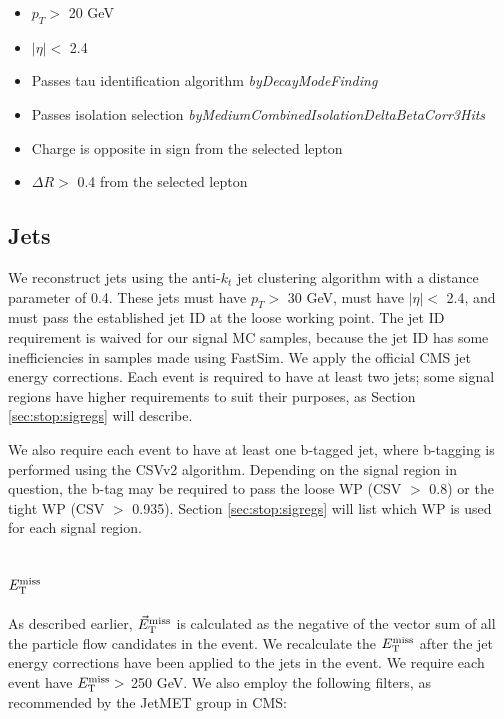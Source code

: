 \begin{itemize}
\item $p_T >$ 20 GeV
\item $|\eta| <$ 2.4
\item Passes tau identification algorithm \emph{byDecayModeFinding}
\item Passes isolation selection
  \emph{byMediumCombinedIsolationDeltaBetaCorr3Hits}
\item Charge is opposite in sign from the selected lepton
\item $\Delta R >$ 0.4 from the selected lepton
\end{itemize}

\subsection{Jets}
\label{ssec:stop:jets}

We reconstruct jets using the anti-$k_t$ jet clustering algorithm
\cite{antikt} with a distance parameter of 0.4. These jets must have
$p_T >$ 30 GeV, must have $|\eta| <$ 2.4, and must pass the
established jet ID at the loose working point. The jet ID requirement
is waived for our signal MC samples, because the jet ID has some
inefficiencies in samples made using FastSim. We apply the official
CMS jet energy corrections. Each event is required to have at least
two jets; some signal regions have higher requirements to
suit their purposes, as Section \ref{sec:stop:sigregs} will describe.

We also require each event to have at least one b-tagged jet, where
b-tagging is performed using the CSVv2 algorithm. Depending on the
signal region in question, the b-tag may be required to pass the loose
WP (CSV $>$ 0.8) or the tight WP (CSV $>$ 0.935). Section
\ref{sec:stop:sigregs} will list which WP is used for each signal region.

\subsection{\texorpdfstring{$E_\text{T}^\text{miss}$}{MET}}
\label{ssec:stop:met}

As described earlier, $\vec{E}_\text{T}^\text{miss}$ is calculated as the negative of the vector
sum of all the particle flow candidates in the event. We recalculate
the $E_\text{T}^\text{miss}$ after the jet energy corrections have been applied to the jets
in the event. We require each event have $E_\text{T}^\text{miss} >$ 250 GeV. We also
employ the following filters, as recommended by the JetMET group in CMS:

